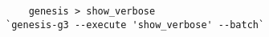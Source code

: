 \begin{verbatim}
    genesis > show_verbose
`genesis-g3 --execute 'show_verbose' --batch`
\end{verbatim}
